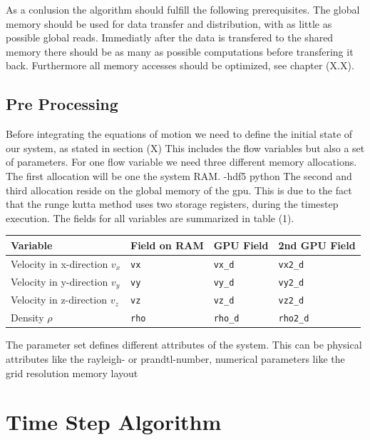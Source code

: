 As a conlusion the algorithm should fulfill the following prerequisites.
The global memory should be used for data transfer and distribution, with as little as possible global reads.
Immediatly after the data is transfered to the shared memory there should be as many as possible computations before transfering
it back. Furthermore all memory accesses should be optimized, see chapter (X.X).

\subsection{Pre Processing}

\label{cuda:prepro}
Before integrating the equations of motion we need to define the initial state of our system, as stated in section (X)
This includes the flow variables but also a set of parameters.
For one flow variable we need three different memory allocations.
The first allocation will be one the system RAM.
-hdf5 python
The second and third allocation reside on the global memory of the gpu.
This is due to the fact that the runge kutta method uses two storage registers, during the timestep execution.
The fields for all variables are summarized in table (1).

\begin{center}
    \begin{tabular}{ | l | l | l | l |}
    \hline
    Variable & Field on RAM & GPU Field & 2nd GPU Field \\
    \hline
    Velocity in x-direction $v_x$  & \texttt{vx}   &  \texttt{vx\_d}   & \texttt{vx2\_d}   \\
    Velocity in y-direction $v_y$  & \texttt{vy}   &  \texttt{vy\_d}   & \texttt{vy2\_d}   \\
    Velocity in z-direction $v_z$  & \texttt{vz}   &  \texttt{vz\_d}   & \texttt{vz2\_d}   \\
    Density  $\rho$  & \texttt{rho}  &  \texttt{rho\_d}  & \texttt{rho2\_d}  \\
    \hline
    \end{tabular}
\end{center}
The parameter set defines different attributes of the system.
This can be physical attributes like the rayleigh- or prandtl-number, numerical parameters like the grid resolution
memory layout

\clearpage

\section{Time Step Algorithm}

